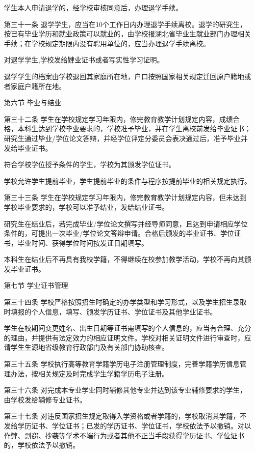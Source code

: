 \documentclass[UTF8,12pt,a4paper]{report}
\begin{document}
学生本人申请退学的，经学校审核同意后，办理退学手续。

第三十一条 退学学生，应当在10个工作日内办理退学手续离校。退学的研究生，按已有毕业学历和就业政策可以就业的，由学校报湖北省毕业生就业部门办理相关手续；在学校规定期限内没有聘用单位的，应当办理退学手续离校。

对退学学生,学校发给肄业证书或者写实性学习证明。

退学学生的档案由学校退回其家庭所在地，户口按照国家相关规定迁回原户籍地或者家庭户籍所在地。

第六节 毕业与结业

第三十二条 学生在学校规定学习年限内，修完教育教学计划规定内容，成绩合格，本科生达到学校毕业要求的，学校准予毕业，并在学生离校前发给毕业证书；研究生通过毕业/学位论文答辩，并经学位评定分委员会表决通过后，准予毕业并发给毕业证书。

符合学校学位授予条件的学生，学校为其颁发学位证书。

学校允许学生提前毕业，学生提前毕业的条件与程序按提前毕业的相关规定执行。

第三十三条 学生在学校规定学习年限内，修完教育教学计划规定内容，但未达到学校毕业要求的，学校可以准予结业，发给结业证书。

研究生在结业后，若完成毕业/学位论文撰写并经导师同意，且达到申请相应学位条件的，可提出一次毕业/学位论文答辩申请。合格后颁发的毕业证书、学位证书，毕业时间、获得学位时间按发证日期填写。

本科生在结业后不再具有我校学籍，不得继续在校参加教学活动，学校不再向其颁发毕业证书。

第七节 学业证书管理

第三十四条 学校严格按照招生时确定的办学类型和学习形式，以及学生招生录取时填报的个人信息，填写、颁发学历证书、学位证书及其他学业证书。

学生在校期间变更姓名、出生日期等证书需填写的个人信息的，应当有合理、充分的理由，并提供有法定效力的相应证明文件。学校对相关证明文件进行审查时，应请学生生源地省级教育行政部门及有关部门协助核查。

第三十五条 学校执行高等教育学籍学历电子注册管理制度，完善学籍学历信息管理办法，按相关规定及时完成学生学籍学历电子注册。

第三十六条 对完成本专业学业同时辅修其他专业并达到该专业辅修要求的学生，由学校发给辅修专业证书。

第三十七条 对违反国家招生规定取得入学资格或者学籍的，学校取消其学籍，不发给学历证书、学位证书；已发的学历证书、学位证书，学校依法予以撤销。对以作弊、剽窃、抄袭等学术不端行为或者其他不正当手段获得学历证书、学位证书的，学校依法予以撤销。
\end{document}
